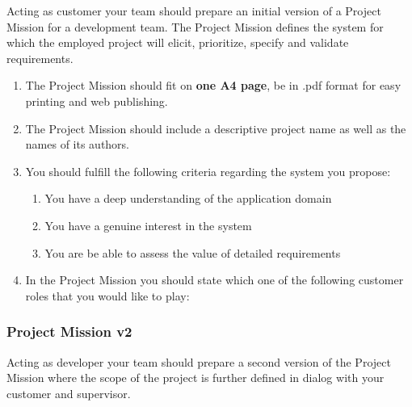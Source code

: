 \documentclass[10pt,a4paper]{article}
\begin{document}
Acting as customer your team should prepare an initial version of a Project Mission for a development team. The Project Mission defines the system for which the employed project will elicit, prioritize, specify and validate requirements.

 \begin{enumerate}[noitemsep]
 \item The Project Mission should fit on {\bf one A4 page}, be in .pdf format for easy printing and web publishing. 
 \item The Project Mission should include a descriptive project name as well as the names of its authors.


\item You should fulfill the following criteria regarding the system you propose:
\begin{enumerate}
\item You have a deep understanding of the application domain 
\item You have a genuine interest in the system 
\item You are be able to assess the value of detailed requirements 
\end{enumerate}
\item In the Project Mission you should state which one of the following customer roles that you would like to play:
\end{enumerate}

\subsubsection{Project Mission v2}
Acting as developer your team should prepare a second version of the Project Mission where the scope of the project is further defined in dialog with your customer and supervisor. 
 
\end{document}
